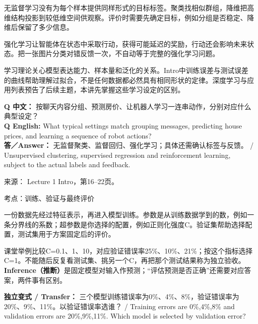 无监督学习没有为每个样本提供同样形式的目标标签。聚类找相似群组，降维把高维结构投影到较低维空间供观察。评价时需要先确定目标，例如分组是否稳定、降维后保留了多少信息。


强化学习让智能体在状态中采取行动，获得可能延迟的奖励，行动还会影响未来状态。把一张图片分类对错反馈一次，不自动等于完整的强化学习问题。


学习理论关心模型表达能力、样本量和泛化的关系。Intro中训练误差与测试误差的曲线帮助理解过拟合，不是任何数据都必然具有相同形状的定律。深度学习与应用列表预告了后续主题，本讲先掌握这些学习设定的区别。


\textbf{Q 中文：} 按聊天内容分组、预测房价、让机器人学习一连串动作，分别对应什么典型设定？\\

\textbf{Q English:} What typical settings match grouping messages, predicting house prices, and learning a sequence of robot actions?\\

\textbf{答／Answer：} 无监督聚类、监督回归、强化学习；具体还需确认标签与反馈。 / Unsupervised clustering, supervised regression and reinforcement learning, subject to the actual labels and feedback.


来源： Lecture 1 Intro，第16–22页。








考点：训练、验证与最终评价

一份数据先经过特征表示，再进入模型训练。参数是从训练数据学到的数，例如一条分界线的系数；超参数是你选择的配置，例如正则化强度C。验证集帮助选择配置，测试集用于方案固定后的评价。






课堂举例比较C=0.1、1、10，对应验证错误率25\%、10\%、21\%；按这个指标选择C=1。不能随后反复看测试集、挑另一个C，再把那个测试结果称为独立验收。\textbf{Inference（推断）}是固定模型对输入作预测；“评估预测是否正确”还需要对应答案，两件事有区别。


\textbf{独立变式 / Transfer：} 三个模型训练错误率为0\%、4\%、8\%，验证错误率为20\%、9\%、11\%。以验证错误率选谁？ / Training errors are 0\%,4\%,8\% and validation errors are 20\%,9\%,11\%. Which model is selected by validation error?\\

